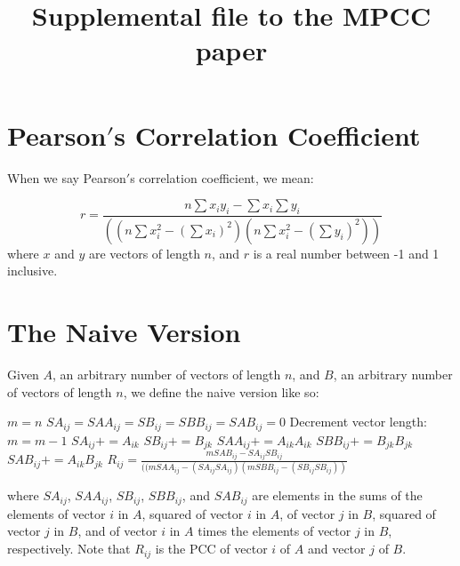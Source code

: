 \documentclass{bioinfo}
\begin{document}
\title[Supplemental file 1]{Supplemental file to the MPCC paper}

\section{Pearson$'$s Correlation Coefficient}
When we say Pearson$'$s correlation coefficient, we mean:

\begin{equation}
r=\frac{n\sum x_iy_i-\sum x_i\sum y_i}{((n\sum x_i^2-(\sum x_i)^2)(n\sum x_i^2-(\sum y_i)^2))}
\end{equation}
where $x$ and $y$ are vectors of length $n$, and $r$ is a real number between -1 and 1 inclusive.

\section{The Naive Version}

Given $A$, an arbitrary number of vectors of length $n$, and $B$, an arbitrary number of vectors of length $n$, 
we define the naive version like so:

\begin{algorithmic}[1]
    \STATE $m=n$
    \STATE $SA_{ij}=SAA_{ij}=SB_{ij}=SBB_{ij}=SAB_{ij}=0$
        \STATE Decrement vector length: $m=m-1$
      \ELSE
        \STATE $SA_{ij}+=A_{ik}$
        \STATE $SB_{ij}+=B_{jk}$
        \STATE $SAA_{ij}+=A_{ik}A_{ik}$
        \STATE $SBB_{ij}+=B_{jk}B_{jk}$
        \STATE $SAB_{ij}+=A_{ik}B_{jk}$
      \ENDIF
    \ENDFOR 
    \STATE $R_{ij}=\frac{mSAB_{ij}-SA_{ij}SB_{ij}}{((mSAA_{ij}-(SA_{ij}SA_{ij})(mSBB_{ij}-(SB_{ij}SB_{ij}))}$
  \ENDFOR
\ENDFOR
\end{algorithmic}

\noindent where 
$SA_{ij}$,
$SAA_{ij}$, 
$SB_{ij}$, 
$SBB_{ij}$, and $SAB_{ij}$ 
are elements in the sums of the elements 
of vector $i$ in $A$, 
squared of vector $i$ in $A$, 
of vector $j$ in $B$, 
squared of vector $j$ in $B$, and
of vector $i$ in $A$ times the  elements of vector $j$ in $B$, respectively.
Note that $R_{ij}$ is the PCC of vector $i$ of $A$ and vector $j$ of $B$.
\end{document}
